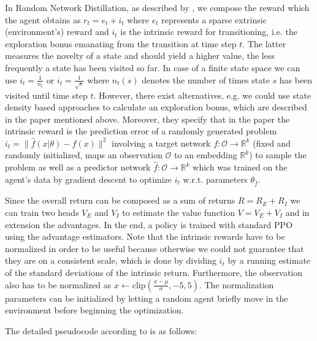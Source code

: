 In Random Network Distillation, as described by \cite{rnd-paper}, we compose the reward which the agent obtains as $r_{t} = e_{t} + i_{t}$ where $e_{t}$ represents a sparse extrinsic (environment's) reward and $i_{t}$ is the intrinsic reward for transitioning, i.e. the exploration bonus emanating from the transition at time step $t$. The latter measures the novelty of a state and should yield a higher value, the less frequently a state has been visited so far. In case of a finite state space we can use $i_{t} = \frac{1}{n_{t}}$ or $i_{t} = \frac{1}{\sqrt{s}}$ where $n_{t}(s)$ denotes the number of times state $s$ has been visited until time step $t$. However, there exist alternatives, e.g. we could use state density based approaches to calculate an exploration bonus, which are described in the paper mentioned above. Moreover, they specify that in the paper the intrinsic reward is the prediction error of a randomly generated problem $i_{t} = \|\hat{f}(x|\theta) - f(x)\|^{2}$ involving a target network $f: \mathcal{O} \rightarrow \mathbb{R}^{k}$ (fixed and randomly initialized, maps an observation $\mathcal{O}$ to an embedding $\mathbb{R}^{k}$) to sample the problem as well as a predictor network $\hat{f}: \mathcal{O} \rightarrow \mathbb{R}^{k}$ which was trained on the agent's data by gradient descent to optimize $i_{t}$ w.r.t. parameters $\theta_{\hat{f}}$.

\noindent Since the overall return can be composed as a sum of returns $R = R_{E} + R_{I}$ we can train two heads $V_{E}$ and $V_{I}$ to estimate the value function $V = V_{E} + V_{I}$ and in extension the advantages. In the end, a policy is trained with standard \textsc{PPO} using the advantage estimators. Note that the intrinsic rewards have to be normalized in order to be useful because otherwise we could not guarantee that they are on a consistent scale, which is done by dividing $i_{t}$ by a running estimate of the standard deviations of the intrinsic return. Furthermore, the observation also has to be normalized as $x \leftarrow \text{clip}(\frac{x - \mu}{\sigma}, -5, 5)$. The normalization parameters can be initialized by letting a random agent briefly move in the environment before beginning the optimization.

\noindent The detailed pseudocode according to \cite{rnd-paper} is as follows:

